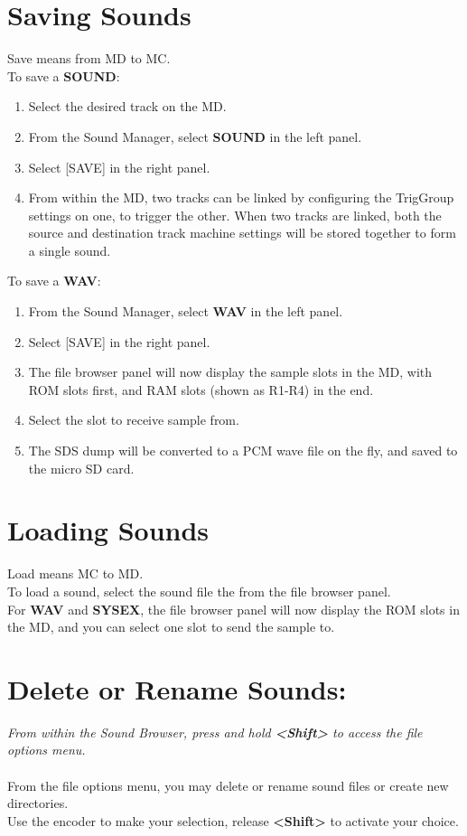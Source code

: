 \section{Saving Sounds}
Save means from MD to MC.\\
To save a \textbf{SOUND}:
\begin{enumerate}
 \item Select the desired track on the MD.
 \item From the Sound Manager, select \textbf{SOUND} in the left panel.
 \item Select [SAVE] in the right panel.
 \item From within the MD, two tracks can be linked by configuring the TrigGroup settings on one, to trigger the other. When two tracks are linked, both the source and destination track machine settings will be stored together to form a single sound.
\end{enumerate}
To save a \textbf{WAV}:
\begin{enumerate}
    \item From the Sound Manager, select \textbf{WAV} in the left panel.
    \item Select [SAVE] in the right panel.
    \item The file browser panel will now display the sample slots in the MD, with ROM slots first, and RAM slots (shown as R1-R4) in the end.
    \item Select the slot to receive sample from.
    \item The SDS dump will be converted to a PCM wave file on the fly, and saved to the micro SD card.
\end{enumerate}

\section{Loading Sounds}
Load means MC to MD.\\
To load a sound, select the sound file the from the file browser panel.\\
For \textbf{WAV} and \textbf{SYSEX}, the file browser panel will now display the ROM slots in the MD, and you can select one slot to send the sample to.

\section{Delete or Rename Sounds:}
\textit{From within the Sound Browser, press and hold \textbf{<Shift>} to access the file options menu.}\\\\
From the file options menu, you may delete or rename sound files or create new directories.\\
Use the encoder to make your selection, release \textbf{<Shift>} to activate your choice.
